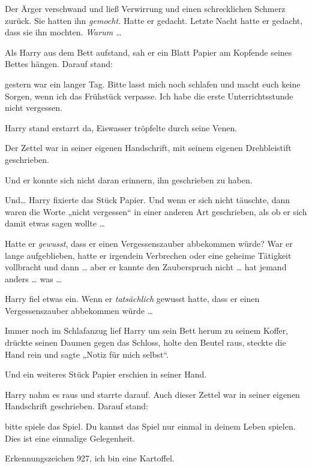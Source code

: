 Der Ärger verschwand und ließ Verwirrung und einen schrecklichen Schmerz zurück. Sie hatten ihn \emph{gemocht.} Hatte er gedacht. Letzte Nacht hatte er gedacht, dass sie ihn mochten. \emph{Warum …}

Als Harry aus dem Bett aufstand, sah er ein Blatt Papier am Kopfende seines Bettes hängen. Darauf stand: 

\begin{writtenNote}

gestern war ein langer Tag. Bitte lasst mich noch schlafen und macht euch keine Sorgen, wenn ich das Frühstück verpasse. Ich habe die erste Unterrichtsstunde nicht vergessen.

\end{writtenNote}

Harry stand erstarrt da, Eiswasser tröpfelte durch seine Venen. 

Der Zettel war in seiner eigenen Handschrift, mit seinem eigenen Drehbleistift geschrieben. 

Und er konnte sich nicht daran erinnern, ihn geschrieben zu haben. 

Und… Harry fixierte das Stück Papier. Und wenn er sich nicht täuschte, dann waren die Worte „nicht vergessen“ in einer anderen Art geschrieben, als ob er sich damit etwas sagen wollte … 

Hatte er \emph{gewusst}, dass er einen Vergessenszauber abbekommen würde? War er lange aufgeblieben, hatte er irgendein Verbrechen oder eine geheime Tätigkeit vollbracht und dann … aber er kannte den Zauberspruch nicht … hat jemand anders … was … 

Harry fiel etwas ein. Wenn er \emph{tatsächlich} gewusst hatte, dass er einen Vergessenszauber abbekommen würde … 

Immer noch im Schlafanzug lief Harry um sein Bett herum zu seinem Koffer, drückte seinen Daumen gegen das Schloss, holte den Beutel raus, steckte die Hand rein und sagte „Notiz für mich selbst“. 

Und ein weiteres Stück Papier erschien in seiner Hand. 

Harry nahm es raus und starrte darauf. Auch dieser Zettel war in seiner eigenen Handschrift geschrieben. Darauf stand: 

\begin{writtenNote}

bitte spiele das Spiel. Du kannst das Spiel nur einmal in deinem Leben spielen. Dies ist eine einmalige Gelegenheit.

Erkennungszeichen 927, ich bin eine Kartoffel.

\end{writtenNote}

